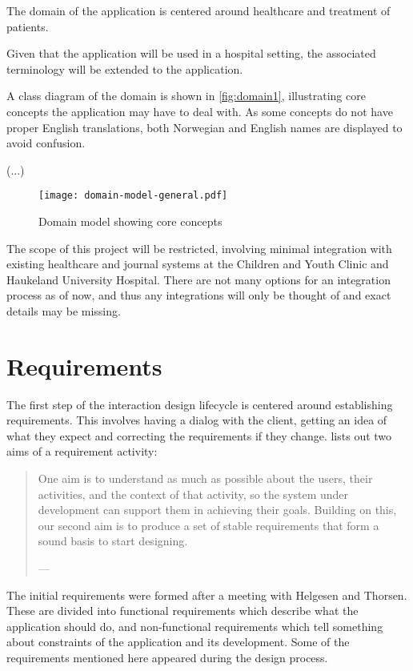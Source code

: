 The domain of the application is centered around healthcare and treatment of patients.


Given that the application will be used in a hospital setting, the associated terminology will be extended to the application.

A class diagram of the domain is shown in \autoref{fig:domain1}, illustrating core concepts the application may have to deal with. As some concepts do not have proper English translations, both Norwegian and English names are displayed to avoid confusion.

(...)


\begin{figure}
    \centering
    \texttt{[image: domain-model-general.pdf]}
    \caption{Domain model showing core concepts}
    \label{fig:domain1}
\end{figure}

The scope of this project will be restricted, involving minimal integration with existing healthcare and journal systems at the Children and Youth Clinic and Haukeland University Hospital. There are not many options for an integration process as of now, and thus any integrations will only be thought of and exact details may be missing.

\section{Requirements}
\label{sec:requirements}

The first step of the interaction design lifecycle is centered around establishing requirements. This involves having a dialog with the client, getting an idea of what they expect and correcting the requirements if they change. \textcite{preece2015} lists out two aims of a requirement activity:

\begin{quote}
    One aim is to understand as much as possible about the users, their activities, and the context of that activity, so the system under development can support them in achieving their goals. Building on this, our second aim is to produce a set of stable requirements that form a sound basis to start designing.

    \raggedleft--- \textcite{preece2015}
\end{quote}

The initial requirements were formed after a meeting with Helgesen and Thorsen. These are divided into functional requirements which describe what the application should do, and non-functional requirements which tell something about constraints of the application and its development. Some of the requirements mentioned here appeared during the design process.

